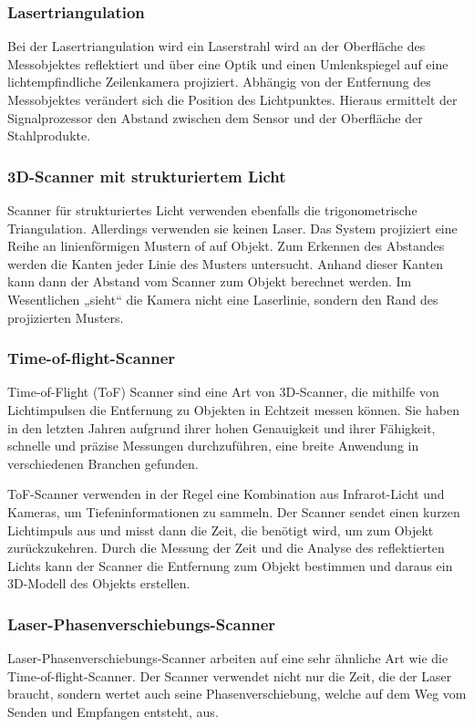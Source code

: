 \subsubsection{Lasertriangulation}
Bei der Lasertriangulation wird ein Laserstrahl wird an der Oberfläche des Messobjektes reflektiert und über eine Optik und einen Umlenkspiegel auf eine lichtempfindliche Zeilenkamera projiziert. Abhängig von der Entfernung des Messobjektes verändert sich die Position des Lichtpunktes. Hieraus ermittelt der Signalprozessor den Abstand zwischen dem Sensor und der Oberfläche der Stahlprodukte. \cite[vgl.][]{Lasertriangulation}

\subsubsection{3D-Scanner mit strukturiertem Licht}
Scanner für strukturiertes Licht verwenden ebenfalls die trigonometrische Triangulation. Allerdings verwenden sie keinen Laser. Das System projiziert eine Reihe an linienförmigen Mustern of auf Objekt. Zum Erkennen des Abstandes werden die Kanten jeder Linie des Musters untersucht. Anhand dieser Kanten kann dann der Abstand vom Scanner zum Objekt berechnet werden. Im Wesentlichen „sieht“ die Kamera nicht eine Laserlinie, sondern den Rand des projizierten Musters. \cite[vgl.][]{strukturiertsLicht}

\subsubsection{Time-of-flight-Scanner}
Time-of-Flight (ToF) Scanner sind eine Art von 3D-Scanner, die mithilfe von Lichtimpulsen die Entfernung zu Objekten in Echtzeit messen können. Sie haben in den letzten Jahren aufgrund ihrer hohen Genauigkeit und ihrer Fähigkeit, schnelle und präzise Messungen durchzuführen, eine breite Anwendung in verschiedenen Branchen gefunden.

ToF-Scanner verwenden in der Regel eine Kombination aus Infrarot-Licht und Kameras, um Tiefeninformationen zu sammeln. Der Scanner sendet einen kurzen Lichtimpuls aus und misst dann die Zeit, die benötigt wird, um zum Objekt zurückzukehren. Durch die Messung der Zeit und die Analyse des reflektierten Lichts kann der Scanner die Entfernung zum Objekt bestimmen und daraus ein 3D-Modell des Objekts erstellen. \cite[vgl.][]{TOF}

\subsubsection{Laser-Phasenverschiebungs-Scanner}
Laser-Phasenverschiebungs-Scanner arbeiten auf eine sehr ähnliche Art wie die Time-of-flight-Scanner. Der Scanner verwendet nicht nur die Zeit, die der Laser braucht, sondern wertet auch seine Phasenverschiebung, welche auf dem Weg vom Senden und Empfangen entsteht, aus.

